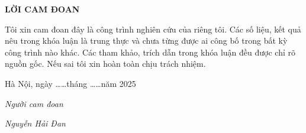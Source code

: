 \documentclass{uetgraduation}
\begin{document}
\newpage
\thispagestyle{empty}
\begin{center}
    \textbf{LỜI CAM ĐOAN}
\end{center}

Tôi xin cam đoan đây là công trình nghiên cứu của riêng tôi. Các số liệu, kết quả nêu trong khóa luận là trung thực và chưa từng được ai công bố trong bất kỳ công trình nào khác. Các tham khảo, trích dẫn trong khóa luận đều được chỉ rõ nguồn gốc. Nếu sai tôi xin hoàn toàn chịu trách nhiệm.

\begin{flushright}
    Hà Nội, ngày \ldots\ldots tháng \ldots\ldots năm 2025

    \vspace{2cm}
    \textit{Người cam đoan}

    \vspace{1cm}
    \textit{Nguyễn Hải Đan}
\end{flushright}






\end{document}
